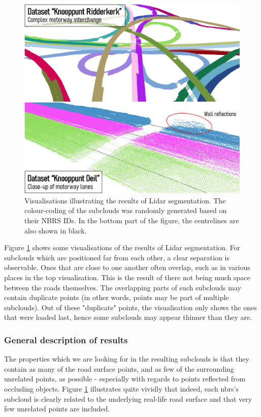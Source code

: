 \begin{figure}
    \centering
    \includegraphics[width=0.86\linewidth]{final_report/figs/lidarsegmentation0.png}
    \caption[Visualisations illustrating the results of Lidar segmentation]{Visualisations illustrating the results of Lidar segmentation. The colour-coding of the subclouds was randomly generated based on their NBRS IDs. In the bottom part of the figure, the centrelines are also shown in black.}
    \label{fig:lidarsegmentation0}
\end{figure}

Figure \ref{fig:lidarsegmentation0} shows some visualisations of the results of Lidar segmentation. For subclouds which are positioned far from each other, a clear separation is observable. Ones that are close to one another often overlap, such as in various places in the top visualisation. This is the result of there not being much space between the roads themselves. The overlapping parts of such subclouds may contain duplicate points (in other words, points may be part of multiple subclouds). Out of these "duplicate" points, the visualisation only shows the ones that were loaded last, hence some subclouds may appear thinner than they are.

\subsubsection{General description of results}

The properties which we are looking for in the resulting subclouds is that they contain as many of the road surface points, and as few of the surrounding unrelated points, as possible - especially with regards to points reflected from occluding objects. Figure \ref{fig:lidarsegmentation0} illustrates quite vividly that indeed, each \ac{nbrs}'s subcloud is clearly related to the underlying real-life road surface and that very few unrelated points are included.

